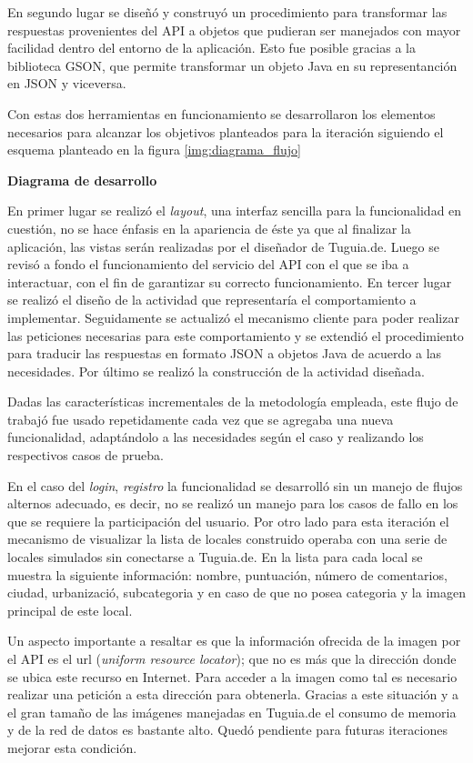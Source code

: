 En segundo lugar se diseñó y construyó un procedimiento para transformar las respuestas provenientes del API a objetos que pudieran ser manejados con mayor facilidad dentro del entorno de la aplicación. Esto fue posible gracias a la biblioteca GSON, que permite transformar un objeto Java en su representanción en JSON y viceversa.

Con estas dos herramientas en funcionamiento se desarrollaron los elementos necesarios para alcanzar los objetivos planteados para la iteración siguiendo el esquema planteado en la figura \ref{img:diagrama_flujo} 


\textbf{Diagrama de desarrollo}

En primer lugar se realizó el \textit{layout}, una interfaz sencilla para la funcionalidad en cuestión, no se hace énfasis en la apariencia de éste ya que al finalizar la aplicación, las vistas serán realizadas por el diseñador de Tuguia.de. Luego se revisó a fondo el funcionamiento del servicio del API con el que se iba a interactuar, con el fin de garantizar su correcto funcionamiento. En tercer lugar se realizó el diseño de la actividad que representaría el comportamiento a implementar. Seguidamente se actualizó el mecanismo cliente para poder realizar las peticiones necesarias para este comportamiento y se extendió el procedimiento para traducir las respuestas en formato JSON a objetos Java de acuerdo a las necesidades. Por último se realizó la construcción de la actividad diseñada.

Dadas las características incrementales de la metodología empleada, este flujo de trabajó fue usado repetidamente cada vez que se agregaba una nueva funcionalidad, adaptándolo a las necesidades según el caso y realizando los respectivos casos de prueba.

En el caso del \textit{login}, \textit{registro} la funcionalidad se desarrolló sin un manejo de flujos alternos adecuado, es decir, no se realizó un manejo para los casos de fallo en los que se requiere la participación del usuario. Por otro lado para esta iteración el mecanismo de visualizar la lista de locales construido operaba con una serie de locales simulados sin conectarse a Tuguia.de. En la lista para cada local se muestra la siguiente información: nombre, puntuación, número de comentarios, ciudad, urbanizació, subcategoria y en caso de que no posea categoria y la imagen principal de este local.

Un aspecto importante a resaltar es que la información ofrecida de la imagen por el API es el url (\textit{uniform resource locator}); que no es más que la dirección donde se ubica este recurso en Internet. Para acceder a la imagen como tal es necesario realizar una petición a esta dirección para obtenerla. Gracias a este situación y a el gran tamaño de las imágenes manejadas en Tuguia.de el consumo de memoria y de la red de datos es bastante alto. Quedó pendiente para futuras iteraciones mejorar esta condición.
 
